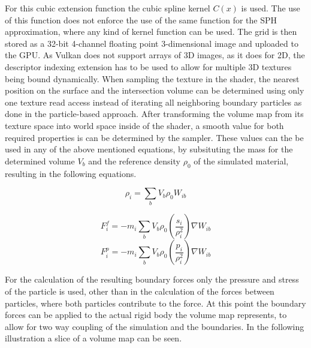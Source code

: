 \documentclass[intern]{cgMA}
\begin{document}
    For this cubic extension function the cubic spline kernel $C(x)$ \cite{doi:10.1146/annurev.aa.30.090192.002551} is used. The use of this function does not enforce the use of the same function for the SPH approximation, where any kind of kernel function can be used. \cite{10.1145/3359566.3360077}
    The grid is then stored as a 32-bit 4-channel floating point 3-dimensional image and uploaded to the GPU. As Vulkan does not support arrays of 3D images, as it does for 2D, the descriptor indexing extension has to be used to allow for multiple 3D textures being bound dynamically. When sampling the texture in the shader, the nearest position on the surface and the intersection volume can be determined using only one texture read access instead of iterating all neighboring boundary particles as done in the particle-based approach. After transforming the volume map from its texture space into world space inside of the shader, a smooth value for both required properties is can be determined by the sampler. These values can the be used in any of the above mentioned equations, by subsituting the mass for the determined volume $V_b$ and the reference density $\rho_0$ of the simulated material, resulting in the following equations.

    \begin{equation}
        \rho_i = \sum_b V_b \rho_0 W_{ib}
    \end{equation}

    \begin{equation}
        F_i^f = -m_i \sum_{b} V_b \rho_0 (\frac{s_i}{\rho_i^2}) \nabla W_{ib}
    \end{equation}
    \begin{equation}
        F_i^p = -m_i \sum_{b} V_b \rho_0 (\frac{p_i}{\rho_i^2}) \nabla W_{ib}
    \end{equation}

    For the calculation of the resulting boundary forces only the pressure and stress of the particle is used, other than in the calculation of the forces between particles, where both particles contribute to the force. At this point the boundary forces can be applied to the actual rigid body the volume map represents, to allow for two way coupling of the simulation and the boundaries. In the following illustration a slice of a volume map can be seen.
\end{document}
